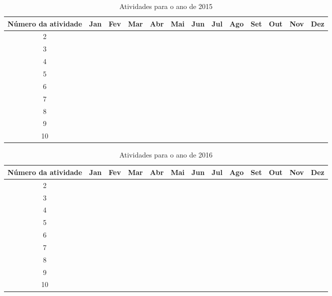 \begin{table}[htpb]
\centering
\caption{Atividades para o ano de 2015}
\label{tab:act2015}
\begin{tabular}{|c|l|l|l|l|l|l|l|l|l|l|l|l|}
\hline
Número da atividade & Jan &  Fev & Mar & Abr & Mai & Jun & Jul & Ago & Set & Out & Nov & Dez \\ \hline
2& & \cellcolor[HTML]{343434}  & \cellcolor[HTML]{343434}   & \cellcolor[HTML]{343434}  & \cellcolor[HTML]{343434}  & \cellcolor[HTML]{343434}  & \cellcolor[HTML]{343434}  &  &   &   &  &  \\ \hline
3& &  &  &  &  &  & \cellcolor[HTML]{343434} & \cellcolor[HTML]{343434}  & \cellcolor[HTML]{343434} &  &  &  \\ \hline
4& &  &  &  &  &  &  &  & \cellcolor[HTML]{343434} & \cellcolor[HTML]{343434}  &  &  \\ \hline
5& &  &  &  &  &  &  &  &  &  & \cellcolor[HTML]{343434} & \cellcolor[HTML]{343434} \\ \hline
6& &  &  &  &  &  &  &  &  &  &  &  \\ \hline
7& &  &  &  &  &  &  &  &  &  &  &  \\ \hline
8& &  &  &  &  &  &  &  &  &  &  &  \\ \hline
9& &  &  &  &  &  &  &  &  &  &  &  \\ \hline
10& &  &  &  &  &  &  &  &  &  &  &  \\ \hline
\end{tabular}
\end{table}

\begin{table}[htpb]
\centering
\caption{Atividades para o ano de 2016}
\label{tab:act2016}
\begin{tabular}{|c|l|l|l|l|l|l|l|l|l|l|l|l|}
\hline
Número da atividade & Jan &  Fev & Mar & Abr & Mai & Jun & Jul & Ago & Set & Out & Nov & Dez \\ \hline
2& &  &  &  &  &  & &  &   &   &  &  \\ \hline
3& &  &  &  &  &  &  &  &  &  &  &  \\ \hline
4& &  &  &  &  &  &  &  &  &   &  &  \\ \hline
5& &  &  &  &  &  &  &  &  &  &  &  \\ \hline
6& \cellcolor[HTML]{343434} & \cellcolor[HTML]{343434} &  &  &  &  &  &  &  &  &  &  \\ \hline
7& & \cellcolor[HTML]{343434} & \cellcolor[HTML]{343434} &   &  & &  &  &  &  &  &  \\ \hline
8& & \cellcolor[HTML]{343434}   & \cellcolor[HTML]{343434}  & \cellcolor[HTML]{343434}  & \cellcolor[HTML]{343434} &  &  &  &  &  &  &  \\ \hline
9& &  &  &  & &
\cellcolor[HTML]{343434} &  &  &  &  &  &  \\ \hline
10& &  &  &  &  & \cellcolor[HTML]{343434} & \cellcolor[HTML]{343434} &  &  &  &  &  \\ \hline
\end{tabular}
\end{table}
